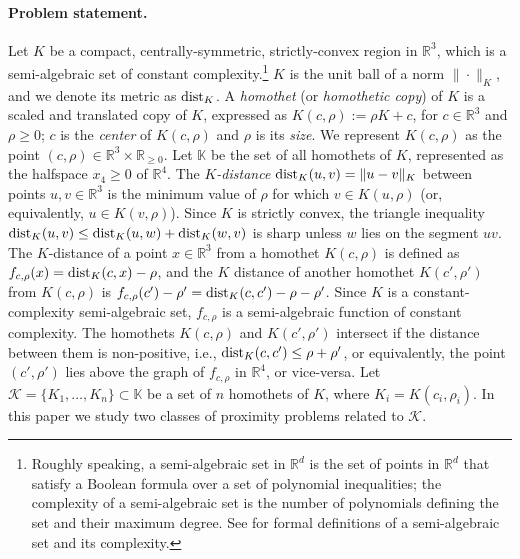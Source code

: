 \documentclass[11pt]{article}
\def\reals{{\mathbb R}}
\def\Kspace{{\mathbb K}}
\def\dist{{\rm dist}}
\def\K{\mathcal{K}}
\theoremstyle{definition}
\begin{document}
\paragraph{Problem statement.}
\fi
Let $K$ be a compact, centrally-symmetric, strictly-convex region in $\reals^3$, which 
is a semi-algebraic set of constant complexity.\footnote{%
  Roughly speaking, a semi-algebraic set in $\reals^d$ is the set of points in $\reals^d$ that 
  satisfy a Boolean formula over a set of polynomial inequalities; the complexity of a semi-algebraic 
  set is the number of polynomials defining the set and their maximum degree.
  See \cite{BPR} for formal definitions of a semi-algebraic set and its complexity.}
$K$ is the unit ball of a norm
$\|\cdot\|_K$, and we denote its metric as $\dist_K$. 
%
A \emph{homothet} (or \emph{homothetic copy}) of $K$ is a scaled and translated copy of $K$, expressed as
$K(c,\rho) := \rho K + c$, for $c\in\reals^3$ and $\rho \ge 0$; $c$ is the \emph{center}
of $K(c,\rho)$ and $\rho$ is its \emph{size}. We represent $K(c,\rho)$ as the point 
$(c,\rho)\in\reals^3\times\reals_{\ge 0}$. Let $\Kspace$ be the set of all homothets of 
$K$, represented as the halfspace $x_4\ge 0$ of $\reals^4$.  
The \emph{$K$-distance} $\dist_K(u,v) = \|u-v\|_K$ between points $u,v\in\reals^3$
is the minimum value of $\rho$ for which 
$v\in K(u,\rho)$ (or, equivalently, $u\in K(v,\rho)$). Since $K$ is strictly convex, the 
triangle inequality $\dist_K(u,v) \le \dist_K(u,w) + \dist_K(w,v)$ is sharp unless $w$ lies 
on the segment $uv$.
The $K$-distance of a point $x\in\reals^3$ from a homothet $K(c,\rho)$ is defined as 
$f_{c,\rho}(x) = \dist_K(c,x)-\rho$, 
and the $K$ distance of another homothet $K(c',\rho')$ from $K(c,\rho)$ is $f_{c,\rho}(c')-\rho' = \dist_K(c,c')-\rho-\rho'$. 
Since $K$ is a constant-complexity semi-algebraic set, $f_{c,\rho}$ is 
a semi-algebraic function of constant complexity. 
The homothets $K(c,\rho)$ and $K(c',\rho')$ intersect if the distance between them is non-positive, 
i.e., $\dist_K(c,c') \le \rho+\rho'$, or equivalently, the point $(c',\rho')$ lies 
above the graph of $f_{c,\rho}$ in $\reals^4$, or vice-versa.
%
Let $\K=\{K_1, \ldots, K_n\} \subset \Kspace$ be a set of $n$ homothets of $K$, where 
$K_i=K(c_i,\rho_i)$. In this paper we study two classes of proximity problems related to $\K$.
%
\medskip
\end{document}
